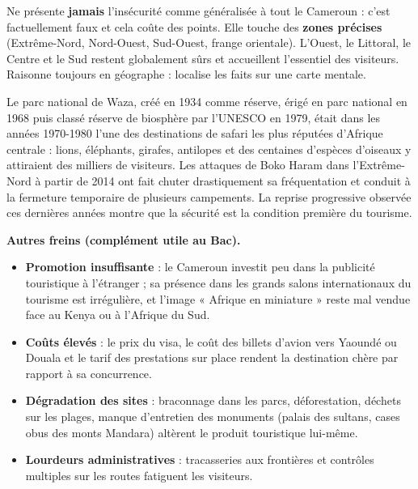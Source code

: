 \documentclass[11pt]{article}
\newcounter{popsec}
\newcounter{popsub}
\newcommand{\courssub}[1]{%
  \stepcounter{popsub}%
  \par\vspace{9pt}\noindent{\popxbold\fontsize{11.5}{13}\selectfont\color{popink}{\color{poporange}\thepopsec.\thepopsub}\hspace{6pt}#1}\par\nopagebreak\vspace{4pt}
}
\begin{document}
\begin{attention}
Ne présente \textbf{jamais} l'insécurité comme généralisée à tout le Cameroun : c'est factuellement faux et cela coûte des points. Elle touche des \textbf{zones précises} (Extrême-Nord, Nord-Ouest, Sud-Ouest, frange orientale). L'Ouest, le Littoral, le Centre et le Sud restent globalement sûrs et accueillent l'essentiel des visiteurs. Raisonne toujours en géographe : localise les faits sur une carte mentale.
\end{attention}

\begin{savaistu}
Le parc national de Waza, créé en 1934 comme réserve, érigé en parc national en 1968 puis classé réserve de biosphère par l'UNESCO en 1979, était dans les années 1970-1980 l'une des destinations de safari les plus réputées d'Afrique centrale : lions, éléphants, girafes, antilopes et des centaines d'espèces d'oiseaux y attiraient des milliers de visiteurs. Les attaques de Boko Haram dans l'Extrême-Nord à partir de 2014 ont fait chuter drastiquement sa fréquentation et conduit à la fermeture temporaire de plusieurs campements. La reprise progressive observée ces dernières années montre que la sécurité est la condition première du tourisme.
\end{savaistu}

\courssub{Les autres freins et les conséquences}

\textbf{Autres freins (complément utile au Bac).}

\begin{itemize}
\item \textbf{Promotion insuffisante} : le Cameroun investit peu dans la publicité touristique à l'étranger ; sa présence dans les grands salons internationaux du tourisme est irrégulière, et l'image « Afrique en miniature » reste mal vendue face au Kenya ou à l'Afrique du Sud.
\item \textbf{Coûts élevés} : le prix du visa, le coût des billets d'avion vers Yaoundé ou Douala et le tarif des prestations sur place rendent la destination chère par rapport à sa concurrence.
\item \textbf{Dégradation des sites} : braconnage dans les parcs, déforestation, déchets sur les plages, manque d'entretien des monuments (palais des sultans, cases obus des monts Mandara) altèrent le produit touristique lui-même.
\item \textbf{Lourdeurs administratives} : tracasseries aux frontières et contrôles multiples sur les routes fatiguent les visiteurs.
\end{itemize}
\end{document}
